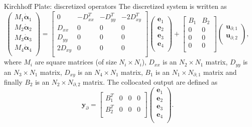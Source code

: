 \documentclass{beamer}
\begin{document}
\begin{frame}{Kirchhoff Plate: discretized operators}
The discretized system is written as 
\begin{equation*}
\begin{pmatrix}
M_1 \dot{\bm{\alpha}}_1 \\
M_2 \dot{\bm{\alpha}}_2 \\
M_3 \dot{\bm{\alpha}}_3 \\
M_4 \dot{\bm{\alpha}}_4 \\
\end{pmatrix} =
\begin{bmatrix}
0   & -D_{xx}^T   & -D_{yy}^T   & -2 D_{xy}^T\\
D_{xx}   & 0   & 0   & 0\\
D_{yy}   & 0   & 0   & 0\\
2 D_{xy}   & 0   & 0   & 0 \\
\end{bmatrix}
\begin{pmatrix}
\bm{e}_1 \\
\bm{e}_2 \\
\bm{e}_3 \\
\bm{e}_4 \\
\end{pmatrix}+  
\begin{bmatrix}
B_1 & B_2\\
0   & 0\\
0   & 0\\
0   & 0 \\
\end{bmatrix}
\begin{pmatrix}
\bm{u}_{\partial, 1} \\
\bm{u}_{\partial, 2} \\
\end{pmatrix},
\end{equation*}
where $M_i$ are square matrices (of size $N_i\times N_i$), $D_{xx}$ is an $N_2 \times N_1$
matrix, $D_{yy}$ is an $N_3 \times N_1$ matrix, $D_{xy}$ is an $N_4 \times N_1$ matrix,  $B_1$ is an $N_1 \times N_{\partial, 1}$ matrix and finally $B_2$ is an $N_2 \times N_{\partial, 2}$ matrix.
The collocated output are defined as
\begin{equation*}
\bm{y}_{\partial} =
\begin{bmatrix}
B_1^T  & 0 & 0 & 0\\
B_2^T  & 0 & 0 & 0\\
\end{bmatrix}
\begin{pmatrix}
\bm{e}_1 \\
\bm{e}_2 \\
\bm{e}_3 \\
\bm{e}_4 \\
\end{pmatrix}.
\end{equation*}
\end{frame}
\end{document}
